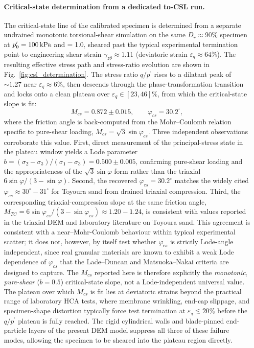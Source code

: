 \paragraph{Critical-state determination from a dedicated to-CSL run.}
The critical-state line of the calibrated specimen is determined from a separate undrained monotonic torsional-shear simulation on the same $D_r \approx 90\%$ specimen at $p^\prime_0 = \SI{100}{kPa}$ and \Kzero{} = 1.0, sheared past the typical experimental termination point to engineering shear strain $\gamma_{z\theta} \approx 1.11$ (deviatoric strain $\varepsilon_q \approx 64\%$). The resulting effective stress path and stress-ratio evolution are shown in Fig.~\ref{fig:csl_determination}. The stress ratio $q/p^{\prime}$ rises to a dilatant peak of $\sim 1.27$ near $\varepsilon_q \approx 6\%$, then descends through the phase-transformation transition and locks onto a clean plateau over $\varepsilon_q \in [23, 46]\%$, from which the critical-state slope is fit:
\begin{equation}
M_{cs} = 0.872 \pm 0.015,
\qquad
\varphi_{cs} = 30.2^{\circ},
\label{eq:Mcs}
\end{equation}
where the friction angle is back-computed from the Mohr--Coulomb relation specific to pure-shear loading, $M_{cs} = \sqrt{3}\sin\varphi_{cs}$. Three independent observations corroborate this value. First, direct measurement of the principal-stress state in the plateau window yields a Lode parameter $b = (\sigma_2 - \sigma_3)/(\sigma_1 - \sigma_3) = 0.500 \pm 0.005$, confirming pure-shear loading and the appropriateness of the $\sqrt{3}\sin\varphi$ form rather than the triaxial $6\sin\varphi/(3\!-\!\sin\varphi)$. Second, the recovered $\varphi_{cs} = 30.2^{\circ}$ matches the widely cited $\varphi_{cs} \approx 30^{\circ}\!-\!31^{\circ}$ for Toyoura sand from drained triaxial compression. Third, the corresponding triaxial-compression slope at the same friction angle, $M_{TC} = 6\sin\varphi_{cs}/(3 - \sin\varphi_{cs}) \approx 1.20\!-\!1.24$, is consistent with values reported in the triaxial DEM and laboratory literature on Toyoura sand. This agreement is consistent with a near--Mohr-Coulomb behaviour within typical experimental scatter; it does not, however, by itself test whether $\varphi_{cs}$ is strictly Lode-angle independent, since real granular materials are known to exhibit a weak Lode dependence of $\varphi_{cs}$ that the Lade--Duncan and Matsuoka--Nakai criteria are designed to capture. The $M_{cs}$ reported here is therefore explicitly the \emph{monotonic, pure-shear} ($b=0.5$) critical-state slope, not a Lode-independent universal value. The plateau over which $M_{cs}$ is fit lies at deviatoric strains beyond the practical range of laboratory HCA tests, where membrane wrinkling, end-cap slippage, and specimen-shape distortion typically force test termination at $\varepsilon_q \lesssim 20\%$ before the $q/p^{\prime}$ plateau is fully reached. The rigid cylindrical walls and blade-pinned end-particle layers of the present DEM model suppress all three of these failure modes, allowing the specimen to be sheared into the plateau region directly.

